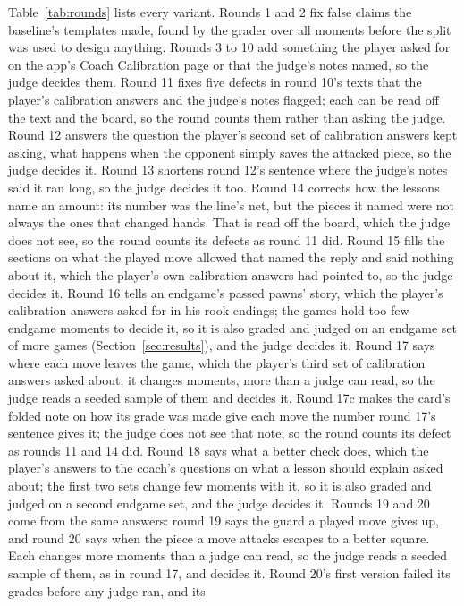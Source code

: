 \documentclass[11pt]{article}
\begin{document}
Table~\ref{tab:rounds} lists every variant. Rounds 1 and 2 fix false claims the baseline's
templates made, found by the grader over all moments before the split was used to design
anything. Rounds 3 to 10 add something the player asked for on the app's Coach Calibration page or
that the judge's notes named, so the judge decides them. Round 11 fixes five defects in round
10's texts that the player's calibration answers and the judge's notes flagged; each can be read
off the text and the board, so the round counts them rather than asking the judge. Round 12
answers the question the player's second set of calibration answers kept asking, what happens
when the opponent simply saves the attacked piece, so the judge decides it. Round 13 shortens round
12's sentence where the judge's notes said it ran long, so the judge decides it too. Round 14
corrects how the lessons name an amount: its number was the line's net, but the pieces it named
were not always the ones that changed hands. That is read off the board, which the judge does not
see, so the round counts its defects as round 11 did. Round 15 fills the sections on what the
played move allowed that named the reply and said nothing about it, which the player's own
calibration answers had pointed to, so the judge decides it. Round 16 tells an endgame's passed
pawns' story, which the player's calibration answers asked for in his rook endings; the \Games{}
games hold too few endgame moments to decide it, so it is also graded and judged on an endgame set
of \EndgameGames{} more games (Section~\ref{sec:results}), and the judge decides it. Round 17
says where each move leaves the game, which the player's third set of calibration answers asked
about; it changes \RoundSeventeenChanged{} moments, more than a judge can read, so the judge reads
a seeded sample of them and decides it. Round 17c makes the card's folded note on how its grade was
made give each move the number round 17's sentence gives it; the judge does not see that note, so
the round counts its defect as rounds 11 and 14 did. Round 18 says what a better check does, which
the player's answers to the coach's questions on what a lesson should explain asked about; the
first two sets change few moments with it, so it is also graded and judged on a second endgame set,
and the judge decides it. Rounds 19 and 20 come from the same answers: round 19 says the guard a
played move gives up, and round 20 says when the piece a move attacks escapes to a better square.
Each changes more moments than a judge can read, so the judge reads a seeded sample of them, as in
round 17, and decides it. Round 20's first version failed its grades before any judge ran, and its
\end{document}
